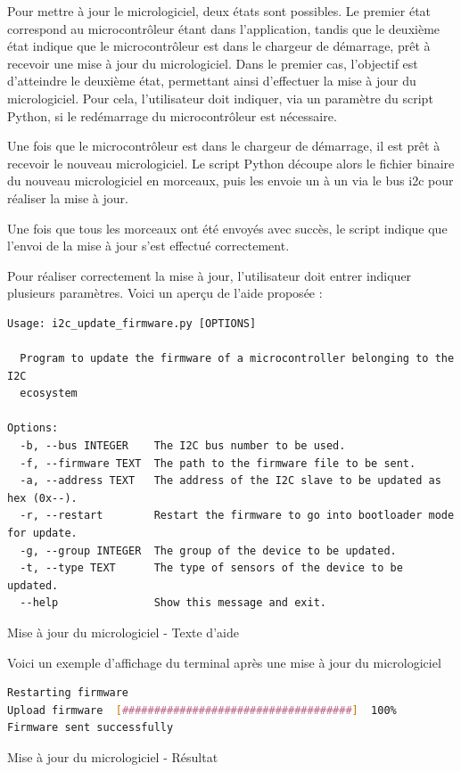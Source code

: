 Pour mettre à jour le micrologiciel, deux états sont possibles.
Le premier état correspond au microcontrôleur étant dans l'application, tandis que le deuxième état indique que le microcontrôleur est dans le chargeur de démarrage, prêt à recevoir une mise à jour du micrologiciel.
Dans le premier cas, l'objectif est d'atteindre le deuxième état, permettant ainsi d'effectuer la mise à jour du micrologiciel.
Pour cela, l'utilisateur doit indiquer, via un paramètre du script Python, si le redémarrage du microcontrôleur est nécessaire.

Une fois que le microcontrôleur est dans le chargeur de démarrage, il est prêt à recevoir le nouveau micrologiciel.
Le script Python découpe alors le fichier binaire du nouveau micrologiciel en morceaux, puis les envoie un à un via le bus \gls{i2c} pour réaliser la mise à jour.

Une fois que tous les morceaux ont été envoyés avec succès, le script indique que l'envoi de la mise à jour s'est effectué correctement.

Pour réaliser correctement la mise à jour, l'utilisateur doit entrer indiquer plusieurs paramètres. Voici un aperçu de l'aide proposée :

\begin{listing}[!h]
    \begin{lstlisting}
Usage: i2c_update_firmware.py [OPTIONS]

  Program to update the firmware of a microcontroller belonging to the I2C
  ecosystem

Options:
  -b, --bus INTEGER    The I2C bus number to be used.
  -f, --firmware TEXT  The path to the firmware file to be sent.
  -a, --address TEXT   The address of the I2C slave to be updated as hex (0x--).
  -r, --restart        Restart the firmware to go into bootloader mode for update.
  -g, --group INTEGER  The group of the device to be updated.
  -t, --type TEXT      The type of sensors of the device to be updated.
  --help               Show this message and exit.
    \end{lstlisting}
    \caption{Mise à jour du micrologiciel - Texte d'aide}
\end{listing}

Voici un exemple d'affichage du terminal après une mise à jour du micrologiciel

\begin{listing}[!h]
    \begin{lstlisting}[language=bash]
Restarting firmware
Upload firmware  [####################################]  100%
Firmware sent successfully
    \end{lstlisting}
    \caption{Mise à jour du micrologiciel - Résultat}
\end{listing}

